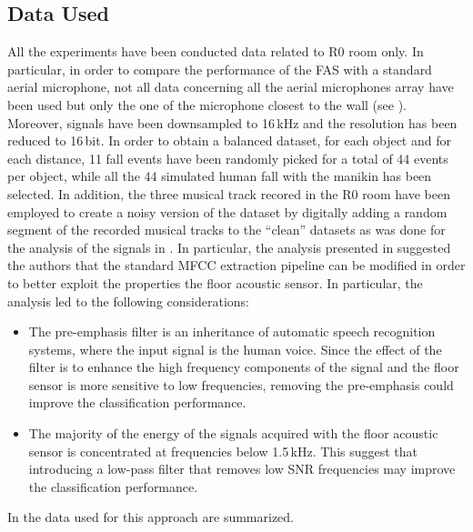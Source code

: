 \subsection{Data Used}
\label{sec:dataset_svm_multiclass}
All the experiments have been conducted data related to R0 room only. In particular, in order to compare the performance of the FAS with a standard aerial microphone, not all data concerning all the aerial microphones array have been used but only the one of the microphone closest to the wall (see ). Moreover, signals have been downsampled to 16\,kHz and the resolution has been reduced to 16\,bit. In order to obtain a balanced dataset, for each object and
for each distance, 11 fall events have been randomly picked for a total of 44 events per
object, while all the 44 simulated human fall with the manikin has been selected. In addition, the three musical track recored in the R0 room have been employed to create a noisy version of
the dataset by digitally adding a random segment of the recorded musical tracks
to the ``clean'' datasets as was done for the analysis of the signals in . In particular, the analysis presented in  suggested the authors that the standard MFCC extraction pipeline can be modified in order to better exploit the properties the floor acoustic sensor. In particular, the analysis led to the following considerations:
\begin{itemize}
	\item The pre-emphasis filter is an inheritance of automatic speech recognition systems, where the input signal is the human voice. Since the effect of the filter is to enhance the high frequency components of the signal and the floor sensor is more sensitive to low frequencies, removing the pre-emphasis could improve the classification performance.
	\item The majority of the energy of the signals acquired with the floor acoustic sensor is concentrated at frequencies below 1.5\,kHz. This suggest that introducing a low-pass filter that removes low SNR frequencies may improve the classification performance.
\end{itemize}
In  the data used for this approach are summarized.
